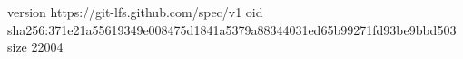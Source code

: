 version https://git-lfs.github.com/spec/v1
oid sha256:371e21a55619349e008475d1841a5379a88344031ed65b99271fd93be9bbd503
size 22004
